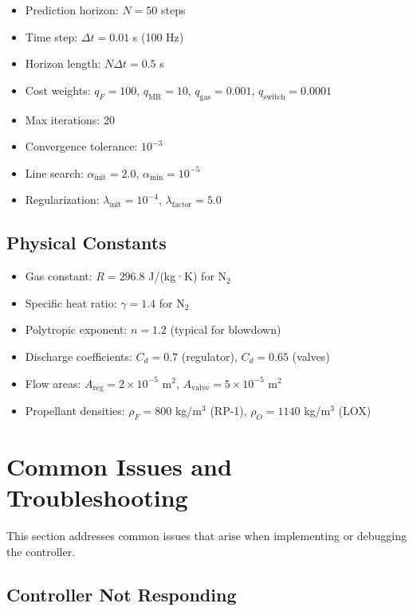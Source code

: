 \documentclass[11pt,a4paper]{article}
\begin{document}
\begin{itemize}
    \item Prediction horizon: $N = 50$ steps
    \item Time step: $\Delta t = 0.01$ s (100 Hz)
    \item Horizon length: $N \Delta t = 0.5$ s
    \item Cost weights: $q_F = 100$, $q_{\text{MR}} = 10$, $q_{\text{gas}} = 0.001$, $q_{\text{switch}} = 0.0001$
    \item Max iterations: 20
    \item Convergence tolerance: $10^{-3}$
    \item Line search: $\alpha_{\text{init}} = 2.0$, $\alpha_{\min} = 10^{-5}$
    \item Regularization: $\lambda_{\text{init}} = 10^{-4}$, $\lambda_{\text{factor}} = 5.0$
\end{itemize}

\subsection{Physical Constants}

\begin{itemize}
    \item Gas constant: $R = 296.8$ J/(kg·K) for N$_2$
    \item Specific heat ratio: $\gamma = 1.4$ for N$_2$
    \item Polytropic exponent: $n = 1.2$ (typical for blowdown)
    \item Discharge coefficients: $C_d = 0.7$ (regulator), $C_d = 0.65$ (valves)
    \item Flow areas: $A_{\text{reg}} = 2 \times 10^{-5}$ m$^2$, $A_{\text{valve}} = 5 \times 10^{-5}$ m$^2$
    \item Propellant densities: $\rho_F = 800$ kg/m$^3$ (RP-1), $\rho_O = 1140$ kg/m$^3$ (LOX)
\end{itemize}

\section{Common Issues and Troubleshooting}

This section addresses common issues that arise when implementing or debugging the controller.

\subsection{Controller Not Responding}
\end{document}
